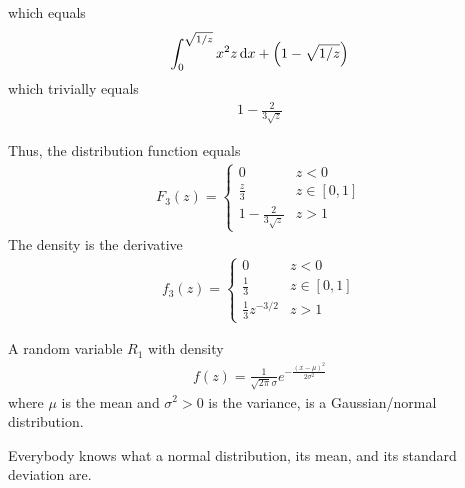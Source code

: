 \begin{solution}
\begin{enumerate}
        which equals
        \begin{align}
            \int_0^{\sqrt{1/z}} x^2 z \dd{x} + \qty(1 - \sqrt{1/z})
        \end{align}
        which trivially equals
        \begin{align}
            1 - \frac{2}{3\sqrt{z}}
        \end{align}
    \end{enumerate}
    Thus, the distribution function equals
    \begin{align}
        F_3(z) = \begin{cases}
            0 & z < 0\\
            \frac{z}{3} & z \in [0,1]\\
            1 - \frac{2}{3\sqrt{z}} & z > 1
        \end{cases}
    \end{align}
    The density is the derivative
    \begin{align}
        f_3(z) = \begin{cases}
            0 & z < 0\\
            \frac{1}{3} & z \in [0,1]\\
            \frac{1}{3}z^{-3/2} & z > 1
        \end{cases}
    \end{align}
\end{solution}

\begin{definition}
    A random variable $R_1$ with density
    \begin{align}
        f(z) = \frac{1}{\sqrt{2\pi}\sigma}e^{-\frac{(x-\mu)^2}{2\sigma^2}}
    \end{align}
    where $\mu$ is the mean and $\sigma^2 > 0$ is the variance, is a Gaussian/normal distribution.
\end{definition}
Everybody knows what a normal distribution, its mean, and its standard deviation are.

